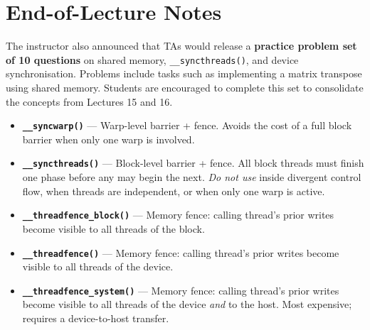 \newpage
\section{End-of-Lecture Notes}


The instructor also announced that TAs would release a \textbf{practice
problem set of 10 questions} on shared memory, \texttt{\_\_syncthreads()},
and device synchronisation. Problems include tasks such as implementing a
matrix transpose using shared memory. Students are encouraged to complete this
set to consolidate the concepts from Lectures 15 and 16.

\vspace{8pt}

\begin{tcolorbox}[colback=gray!8,colframe=gray!50,
  title=\textbf{Quick-Reference: Synchronisation Primitives (Slide 14)},
  fonttitle=\small\bfseries]
\begin{itemize}[noitemsep]
  \item \textbf{\texttt{\_\_syncwarp()}} --- Warp-level barrier + fence.
        Avoids the cost of a full block barrier when only one warp is involved.
  \item \textbf{\texttt{\_\_syncthreads()}} --- Block-level barrier + fence.
        All block threads must finish one phase before any may begin the next.
        \emph{Do not use} inside divergent control flow, when threads are
        independent, or when only one warp is active.
  \item \textbf{\texttt{\_\_threadfence\_block()}} --- Memory fence: calling
        thread's prior writes become visible to all threads of the block.
  \item \textbf{\texttt{\_\_threadfence()}} --- Memory fence: calling thread's
        prior writes become visible to all threads of the device.
  \item \textbf{\texttt{\_\_threadfence\_system()}} --- Memory fence: calling
        thread's prior writes become visible to all threads of the device
        \emph{and} to the host. Most expensive; requires a device-to-host
        transfer.
\end{itemize}
\end{tcolorbox}
\newpage
